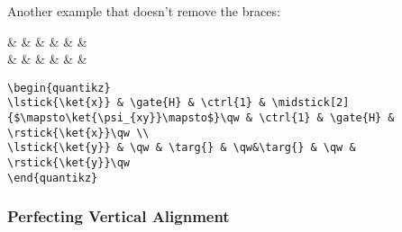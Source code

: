 \documentclass[aps,pra,10pt,nofootinbib]{revtex4}
\begin{document}
Another example that doesn't remove the braces:
\begin{Code}
\begin{center}
\begin{quantikz}[column sep=0.2cm]
 &  &  & \qw &  &  & \qw \\
 & \qw & \targ{} & \qw&\targ{} & \qw & \qw
\end{quantikz}
\end{center}
\tcblower
\begin{lstlisting}
\begin{quantikz}
\lstick{\ket{x}} & \gate{H} & \ctrl{1} & \midstick[2]{$\mapsto\ket{\psi_{xy}}\mapsto$}\qw & \ctrl{1} & \gate{H} & \rstick{\ket{x}}\qw \\
\lstick{\ket{y}} & \qw & \targ{} & \qw&\targ{} & \qw & \rstick{\ket{y}}\qw
\end{quantikz}
\end{lstlisting}
\end{Code}

 \subsubsection{Perfecting Vertical Alignment}
\end{document}
